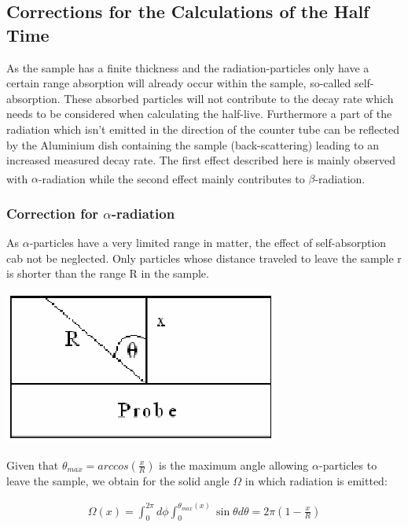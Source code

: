 \documentclass[12pt]{article}
\begin{document}
 \subsection{Corrections for the Calculations of the Half Time}
 
 As the sample has a finite thickness and the radiation-particles only have a certain range absorption will already occur within the sample, so-called self-absorption. These absorbed particles will not contribute to the decay rate which needs to be considered when calculating the half-live. Furthermore a part of the radiation which isn't emitted in the direction of the counter tube can be reflected by the Aluminium dish containing the sample (back-scattering) leading to an increased measured decay rate.
The first effect described here is mainly observed with $\alpha$-radiation while the second effect mainly contributes to $\beta$-radiation. \textsuperscript{\cite{staat}}


\subsubsection{Correction for $\alpha$-radiation}

As $\alpha$-particles have a very limited range in matter, the effect of self-absorption cab not be neglected. Only particles whose distance traveled to leave the sample r is shorter than the range R in the sample. 

%
\vskip0.5cm
\begin{minipage}{\textwidth}
	\centering
	\includegraphics[width=.25\textwidth]{figures/alpha-Korrektur.png}
\end{minipage}
\vskip0.5cm
Given that $\theta_{max}=arccos\left( \frac{x}{R}\right)$   is the maximum angle allowing $\alpha$-particles to leave the sample, we obtain for the 
solid angle $\Omega$ in which radiation is emitted:

\begin{align}
\Omega(x)=\int_{0}^{2\pi}d\phi\int_{0}^{\theta_{max}(x)}\sin\theta d\theta = 2\pi\left( 1-\frac{x}{R}\right)
\end{align}
\end{document}
